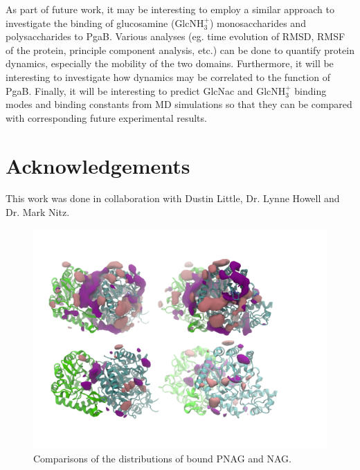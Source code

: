 

As part of future work, it may be interesting to employ a similar approach to investigate the binding of glucosamine (GlcNH$_3^+$) monosaccharides and polysaccharides to PgaB.  Various analyses (eg. time evolution of RMSD, RMSF of the protein, principle component analysis, etc.) can be done to quantify protein dynamics, especially the mobility of the two domains. Furthermore, it will be interesting to investigate how dynamics may be correlated to the function of PgaB.  Finally, it will be interesting to predict GlcNac and GlcNH$_3^+$ binding modes and binding constants from MD simulations so that they can be compared with corresponding future experimental results.

\section{Acknowledgements}
This work was done in collaboration with Dustin Little, Dr. Lynne Howell and Dr. Mark Nitz.

\begin{figure}[htbp]
\centering
\includegraphics[width=7in]{figures/results4/pnag_nag_sdf_zoomedout.png}
\caption{Comparisons of the distributions of bound PNAG and NAG.}
\label{fig:pnag_nag_overlapped_zoomedout}
\end{figure}

